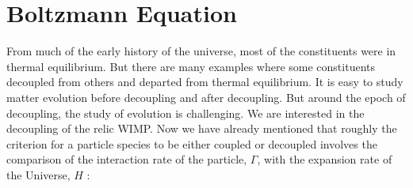 \documentclass[12pt]{report}
\begin{document}









\section{Boltzmann Equation}
	From much of the early history of the universe, most of the constituents were in thermal equilibrium. But there are many examples where some constituents decoupled from others and departed from thermal equilibrium. It is easy to study matter evolution before decoupling and after decoupling. But around the epoch of decoupling, the study of evolution is challenging. We are interested in the decoupling of the relic WIMP. Now we have already mentioned that roughly the criterion for a particle species to be either coupled or decoupled involves the comparison of the interaction rate of the particle, $\Gamma$, with the expansion rate of the Universe, $H$ \cite{kolbbook}: 
	
\end{document}
